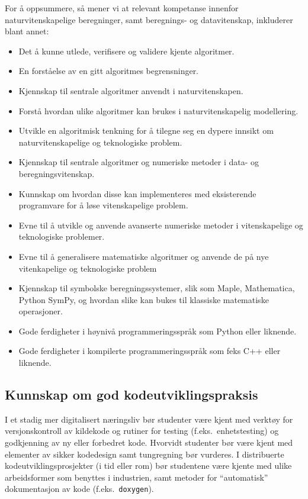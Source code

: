 \documentclass{article}
\begin{document}
For å oppsummere, så mener vi at relevant kompetanse innenfor naturvitenskapelige beregninger, samt beregnings- og datavitenskap, inkluderer blant annet:
\begin{itemize}
  \item Det å kunne utlede, verifisere og validere kjente algoritmer.
  \item En forståelse av en gitt algoritmes begrensninger.
  \item Kjennskap til sentrale algoritmer anvendt i naturvitenskapen.
  \item Forstå hvordan ulike algoritmer kan brukes i naturvitenskapelig modellering.
  \item Utvikle en algoritmisk tenkning for å tilegne seg en dypere innsikt om naturvitenskapelige og teknologiske problem.
  \item Kjennskap til sentrale algoritmer og numeriske metoder i data- og beregningsvitenskap.
  \item Kunnskap om hvordan disse kan implementeres med eksisterende programvare for å løse vitenskapelige problem.
  \item Evne til å utvikle og anvende avanserte numeriske metoder i vitenskapelige og teknologiske problemer.
  \item Evne til å generalisere matematiske algoritmer og anvende de på nye vitenkapelige og teknologiske problem
  \item Kjennskap til symbolske beregningssystemer, slik som Maple, Mathematica, Python SymPy, og hvordan slike kan bukes til klassiske matematiske operasjoner.
  \item Gode ferdigheter i høynivå programmeringsspråk som Python eller liknende.
  \item Gode ferdigheter i kompilerte programmeringsspråk som feks C++ eller liknende.
\end{itemize}

\subsection{Kunnskap om god kodeutviklingspraksis}
I et stadig mer digitalisert næringsliv bør studenter være kjent med verktøy for versjonskontroll av kildekode og rutiner for testing (f.eks.~enhetstesting) og godkjenning av ny eller forbedret kode. Hvorvidt studenter bør være kjent med elementer av sikker kodedesign samt tungregning bør vurderes. I distribuerte kodeutviklingsprosjekter (i tid eller rom) bør studentene være kjente med ulike  arbeidsformer som benyttes i industrien, samt metoder for ``automatisk'' dokumentasjon av kode (f.eks.~\verb+doxygen+).
\end{document}
